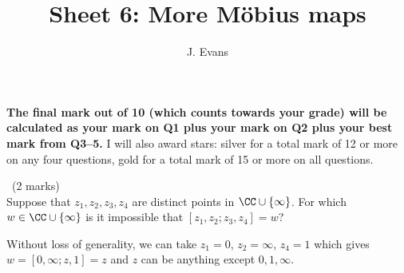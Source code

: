 \documentclass[12pt]{article}
\title{Sheet 6: More M\"obius maps}
\author{J. Evans}
\date{}
\begin{document}
\maketitle

\bigskip

{\bf The final mark out of 10 (which counts towards your grade) will be calculated as your mark on Q1 plus your mark on Q2 plus your best mark from Q3--5.} I will also award stars: silver for a total mark of 12 or more on any four questions, gold for a total mark of 15 or more on all questions.

\vspace{1cm}

\begin{question}\ (2 marks)\\
  Suppose that $z_1,z_2,z_3,z_4$ are distinct points in $\CC\cup\{\infty\}$. For which $w\in\CC\cup\{\infty\}$ is it impossible that $[z_1,z_2;z_3,z_4]=w$?
\end{question}

\begin{answer}
  Without loss of generality, we can take $z_1=0$, $z_2=\infty$, $z_4=1$ which gives $w=[0,\infty;z,1]=z$ and $z$ can be anything except $0,1,\infty$.
\end{answer}
\newpage

\vspace{1cm}
\end{document}
